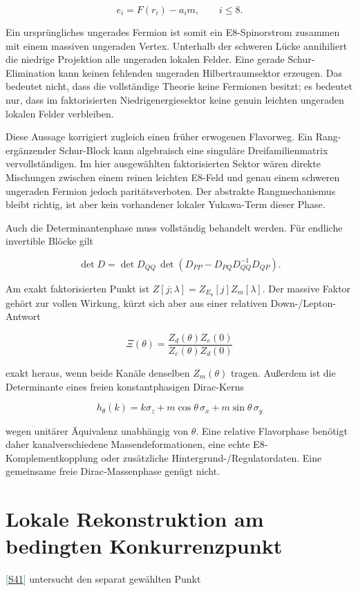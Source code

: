 \documentclass[11pt,a4paper,oneside,parskip=half,headings=normal,numbers=noenddot,bibliography=totoc]{scrreprt}
\newcommand{\src}[1]{\textcolor{teal}{\small[\hyperref[s:#1]{S#1}]}}
\begin{document}
\[
e_i=F(r_i)-a_i m,\qquad i\leq 8.
\]

Ein ursprüngliches ungerades Fermion ist somit ein E8-Spinorstrom zusammen mit einem massiven ungeraden Vertex. Unterhalb der schweren Lücke annihiliert die niedrige Projektion alle ungeraden lokalen Felder. Eine gerade Schur-Elimination kann keinen fehlenden ungeraden Hilbertraumsektor erzeugen. Das bedeutet nicht, dass die vollständige Theorie keine Fermionen besitzt; es bedeutet nur, dass im faktorisierten Niedrigenergiesektor keine genuin leichten ungeraden lokalen Felder verbleiben.

Diese Aussage korrigiert zugleich einen früher erwogenen Flavorweg. Ein Rang-ergänzender Schur-Block kann algebraisch eine singuläre Dreifamilienmatrix vervollständigen. Im hier ausgewählten faktorisierten Sektor wären direkte Mischungen zwischen einem reinen leichten E8-Feld und genau einem schweren ungeraden Fermion jedoch paritätsverboten. Der abstrakte Rangmechanismus bleibt richtig, ist aber kein vorhandener lokaler Yukawa-Term dieser Phase.

Auch die Determinantenphase muss vollständig behandelt werden. Für endliche invertible Blöcke gilt

\[
\det D=\det D_{QQ}\,
\det\!\left(D_{PP}-D_{PQ}D_{QQ}^{-1}D_{QP}\right).
\]

Am exakt faktorisierten Punkt ist \(Z[j;\lambda]=Z_{E_8}[j]Z_m[\lambda]\). Der massive Faktor gehört zur vollen Wirkung, kürzt sich aber aus einer relativen Down-/Lepton-Antwort

\[
\Xi(\theta)=\frac{Z_d(\theta)Z_e(0)}{Z_e(\theta)Z_d(0)}
\]

exakt heraus, wenn beide Kanäle denselben \(Z_m(\theta)\) tragen. Außerdem ist die Determinante eines freien konstantphasigen Dirac-Kerns

\[
h_\theta(k)=k\sigma_z+m\cos\theta\,\sigma_x+m\sin\theta\,\sigma_y
\]

wegen unitärer Äquivalenz unabhängig von \(\theta\). Eine relative Flavorphase benötigt daher kanalverschiedene Massendeformationen, eine echte E8-Komplementkopplung oder zusätzliche Hintergrund-/Regulatordaten. Eine gemeinsame freie Dirac-Massenphase genügt nicht.

\section{Lokale Rekonstruktion am bedingten Konkurrenzpunkt}

\src{41} untersucht den separat gewählten Punkt
\end{document}
